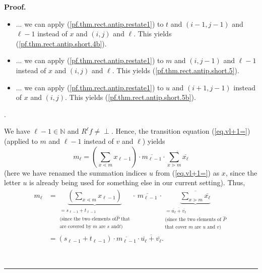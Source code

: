 \documentclass[numbers=enddot,12pt,final,onecolumn,notitlepage]{scrartcl}%
\theoremstyle{definition}
\newenvironment{vershort}{}{}
\newcommand{\undf}{\operatorname*{\bot}}
\newenvironment{proof}[1][Proof]{\noindent\textbf{#1.} }{\ \rule{0.5em}{0.5em}}
\let\sumnonlimits\sum
\renewcommand{\sum}{\sumnonlimits\limits}
\begin{document}
\begin{vershort}
\begin{proof}
{\begin{itemize}
$\ell$ (the reader can easily verify that the requirements for this are
satisfied). This yields (\ref{pf.thm.rect.antip.short.4}) (since an easy
computation shows that $\left(  \ell-1\right)  -i-\left(  j-2\right)
+1=\ell-k$).
\par
\item ... we can apply (\ref{pf.thm.rect.antip.restate1}) to $t$ and $\left(
i-1,j-1\right)  $ and $\ell-1$ instead of $x$ and $\left(  i,j\right)  $ and
$\ell$. This yields (\ref{pf.thm.rect.antip.short.4b}).
\par
\item ... we can apply (\ref{pf.thm.rect.antip.restate1}) to $m$ and $\left(
i,j-1\right)  $ and $\ell-1$ instead of $x$ and $\left(  i,j\right)  $ and
$\ell$. This yields (\ref{pf.thm.rect.antip.short.5}).
\par
\item ... we can apply (\ref{pf.thm.rect.antip.restate1}) to $u$ and $\left(
i+1,j-1\right)  $ instead of $x$ and $\left(  i,j\right)  $. This yields
(\ref{pf.thm.rect.antip.short.5b}).
\end{itemize}
}.

We have $\ell-1\in\mathbb{N}$ and $R^{\ell}f\neq\undf$. Hence, the transition
equation (\ref{eq.vl+1=}) (applied to $m$ and $\ell-1$ instead of $v$ and
$\ell$) yields%
\[
m_{\ell}=\left(  \sum_{x\lessdot m}x_{\ell-1}\right)  \cdot\overline
{m_{\ell-1}}\cdot\overline{\sum_{x\gtrdot m}\overline{x_{\ell}}}%
\]
(here we have renamed the summation indices $u$ from (\ref{eq.vl+1=}) as $x$,
since the letter $u$ is already being used for something else in our current
setting). Thus,%
\begin{align}
m_{\ell}  &  =\underbrace{\left(  \sum_{x\lessdot m}x_{\ell-1}\right)
}_{\substack{=s_{\ell-1}+t_{\ell-1}\\\text{(since the two elements of
}\widehat{P}\text{ that}\\\text{are covered by }m\text{ are }s\text{ and
}t\text{)}}}\cdot\,\overline{m_{\ell-1}}\,\cdot\underbrace{\overline
{\sum_{x\gtrdot m}\overline{x_{\ell}}}}_{\substack{=\overline{\overline
{u_{\ell}}+\overline{v_{\ell}}}\\\text{(since the two elements of }%
\widehat{P}\\\text{that cover }m\text{ are }u\text{ and }v\text{)}%
}}\nonumber\\
&  =\left(  s_{\ell-1}+t_{\ell-1}\right)  \cdot\overline{m_{\ell-1}}%
\cdot\overline{\overline{u_{\ell}}+\overline{v_{\ell}}}.
\label{pf.thm.rect.antip.short.6}%
\end{align}



\end{proof}
\end{vershort}
\end{document}
